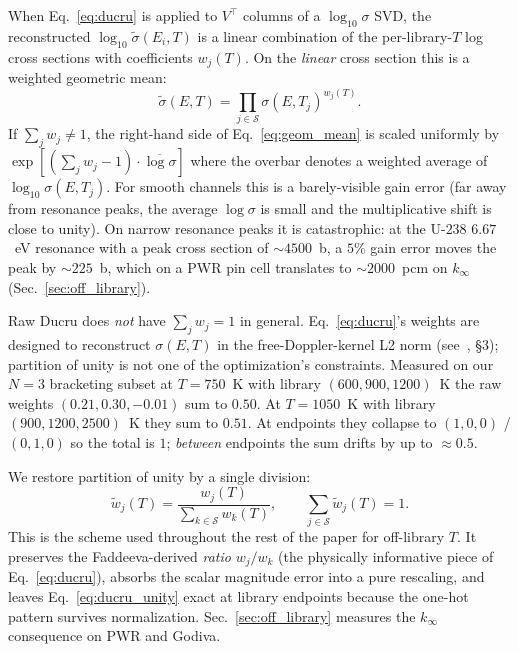 When Eq.~\ref{eq:ducru} is applied to $V^\top$ columns of a
$\log_{10}\sigma$ SVD, the reconstructed
$\log_{10}\tilde\sigma(E_i, T)$ is a linear combination of
the per-library-$T$ log cross sections with coefficients
$w_j(T)$. On the \emph{linear} cross section this is a
weighted geometric mean:
\begin{equation}
\tilde\sigma(E, T)
= \prod_{j \in \mathcal{S}}
   \sigma(E, T_j)^{w_j(T)}.
\label{eq:geom_mean}
\end{equation}
If $\sum_j w_j \neq 1$, the right-hand side of
Eq.~\ref{eq:geom_mean} is scaled uniformly by
$\exp[(\sum_j w_j - 1) \cdot \overline{\log\sigma}]$ where
the overbar denotes a weighted average of
$\log_{10}\sigma(E, T_j)$. For smooth channels this is a
barely-visible gain error (far away from resonance peaks,
the average $\log\sigma$ is small and the multiplicative
shift is close to unity). On narrow resonance peaks it is
catastrophic: at the U-$238$ $6.67$~eV resonance with a
peak cross section of $\sim\!4500$~b, a $5\%$ gain error
moves the peak by $\sim\!225$~b, which on a PWR pin cell
translates to $\sim\!2000$~pcm on $k_\infty$
(Sec.~\ref{sec:off_library}).

Raw Ducru does \emph{not} have $\sum_j w_j = 1$ in general.
Eq.~\ref{eq:ducru}'s weights are designed to reconstruct
$\sigma(E, T)$ in the free-Doppler-kernel L2 norm
(see~\cite{ducru2017}, §3); partition of unity is not one
of the optimization's constraints. Measured on our
$N = 3$ bracketing subset at $T = 750$~K with library
$(600, 900, 1200)$~K the raw weights
$(0.21, 0.30, -0.01)$ sum to $0.50$. At $T = 1050$~K with
library $(900, 1200, 2500)$~K they sum to $0.51$. At
endpoints they collapse to $(1,0,0)$ / $(0,1,0)$ so the
total is $1$; \emph{between} endpoints the sum drifts by
up to $\approx\!0.5$.

We restore partition of unity by a single division:
\begin{equation}
\tilde w_j(T) = \frac{w_j(T)}{\sum_{k \in \mathcal{S}} w_k(T)},
\qquad
\sum_{j \in \mathcal{S}} \tilde w_j(T) = 1.
\label{eq:ducru_unity}
\end{equation}
This is the scheme used throughout the rest of the paper
for off-library $T$. It preserves the Faddeeva-derived
\emph{ratio} $w_j / w_k$ (the physically informative piece
of Eq.~\ref{eq:ducru}), absorbs the scalar magnitude error
into a pure rescaling, and leaves Eq.~\ref{eq:ducru_unity}
exact at library endpoints because the one-hot pattern
survives normalization. Sec.~\ref{sec:off_library} measures
the $k_\infty$ consequence on PWR and Godiva.

